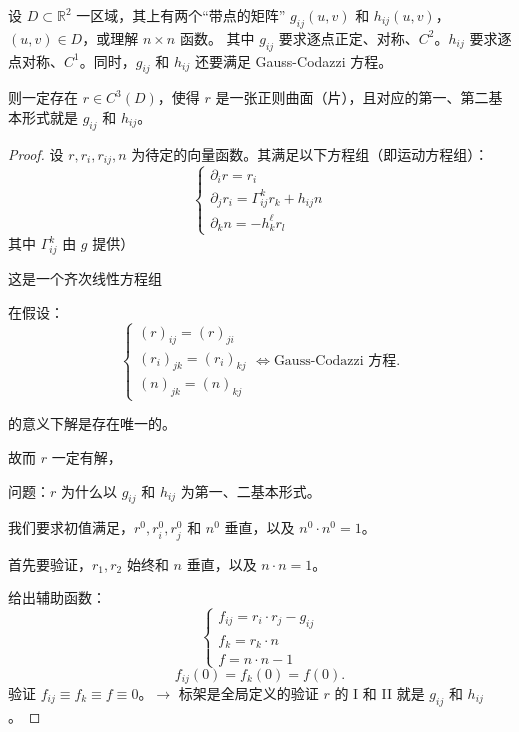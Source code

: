 \documentclass[lang=cn,10pt,thmcnt=section]{elegantbook}
\begin{document}
\begin{theorem}[存在性定理]
    设 $D \subset \mathbb{R}^2$ 一区域，其上有两个“带点的矩阵” $g_{ij}(u,v)$ 和 $h_{ij}(u,v)$，$(u,v) \in D$，或理解 $n \times n$ 函数。
其中 $g_{ij}$ 要求逐点正定、对称、$C^2$。$h_{ij}$ 要求逐点对称、$C^1$。同时，$g_{ij}$ 和 $h_{ij}$ 还要满足 Gauss-Codazzi 方程。

则一定存在 $r \in C^3(D)$，使得 $r$ 是一张正则曲面（片），且对应的第一、第二基本形式就是 $g_{ij}$ 和 $h_{ij}$。
\end{theorem}
\begin{proof}
    设 $r, r_i, r_{ij}, n$ 为待定的向量函数。其满足以下方程组（即运动方程组）：
\[
\begin{cases}
\partial_i r = r_i \\
\partial_j r_i = \Gamma_{ij}^k r_k + h_{ij} n \\
\partial_k n = -h_k^\ell r_l
\end{cases}
\]
其中 $\Gamma_{ij}^k$ 由 $g$ 提供）

这是一个齐次线性方程组

在假设：
\[
\begin{cases}
(r)_{ij} = (r)_{ji} \\
(r_i)_{jk} = (r_i)_{kj} \\
(n)_{jk} = (n)_{kj}
\end{cases}
\Leftrightarrow \text{Gauss-Codazzi 方程}.
\]

的意义下解是存在唯一的。

故而 $r$ 一定有解，

问题：$r$ 为什么以 $g_{ij}$ 和 $h_{ij}$ 为第一、二基本形式。

我们要求初值满足，$r^0, r_i^0, r_j^0$ 和 $n^0$ 垂直，以及 $n^0 \cdot n^0 = 1$。

首先要验证，$r_1, r_2$ 始终和 $n$ 垂直，以及 $n \cdot n = 1$。

给出辅助函数：
\[
\begin{cases}
f_{ij} = r_i \cdot r_j - g_{ij} \\
f_k = r_k \cdot n \\
f = n \cdot n - 1
\end{cases}
\]
\[
f_{ij}(0) = f_k(0) = f(0).
\]
验证 $f_{ij} \equiv f_k \equiv f \equiv 0$。$\rightarrow$ 标架是全局定义的$
$验证 $r$ 的 I 和 II 就是 $g_{ij}$ 和 $h_{ij}$。









\end{proof}
\end{document}
